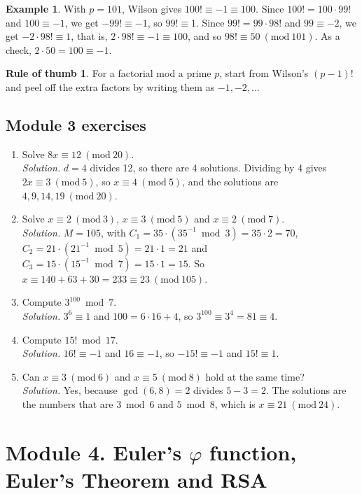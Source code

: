 \documentclass[11pt,a4paper]{article}
\theoremstyle{definition}
\newtheorem{example}[theorem]{Example}
\newcommand{\md}[1]{\ (\mathrm{mod}\ #1)}
\theoremstyle{noteit}
\theoremstyle{note}
\newtheorem*{thumbrule}{Rule of thumb}
\begin{document}
\begin{example}
With $p=101$, Wilson gives $100!\equiv-1\equiv100$. Since $100!=100\cdot99!$ and $100\equiv-1$, we get $-99!\equiv-1$, so $99!\equiv1$. Since $99!=99\cdot98!$ and $99\equiv-2$, we get $-2\cdot98!\equiv1$, that is, $2\cdot98!\equiv-1\equiv100$, and so $98!\equiv50\md{101}$. As a check, $2\cdot50=100\equiv-1$.
\end{example}

\begin{thumbrule}
For a factorial mod a prime $p$, start from Wilson's $(p-1)!$ and peel off the extra factors by writing them as $-1,-2,\dots$
\end{thumbrule}

\subsection*{Module 3 exercises}
\begin{enumerate}[label=\textbf{3.\arabic*}]
\item Solve $8x\equiv12\md{20}$.\\
\emph{Solution.} $d=4$ divides 12, so there are 4 solutions. Dividing by 4 gives $2x\equiv3\md5$, so $x\equiv4\md5$, and the solutions are $4,9,14,19\md{20}$.
\item Solve $x\equiv2\md3$, $x\equiv3\md5$ and $x\equiv2\md7$.\\
\emph{Solution.} $M=105$, with $C_1=35\cdot(35^{-1}\bmod3)=35\cdot2=70$, $C_2=21\cdot(21^{-1}\bmod5)=21\cdot1=21$ and $C_3=15\cdot(15^{-1}\bmod7)=15\cdot1=15$. So $x\equiv140+63+30=233\equiv23\md{105}$.
\item Compute $3^{100}\bmod7$.\\
\emph{Solution.} $3^6\equiv1$ and $100=6\cdot16+4$, so $3^{100}\equiv3^4=81\equiv4$.
\item Compute $15!\bmod17$.\\
\emph{Solution.} $16!\equiv-1$ and $16\equiv-1$, so $-15!\equiv-1$ and $15!\equiv1$.
\item Can $x\equiv3\md6$ and $x\equiv5\md{8}$ hold at the same time?\\
\emph{Solution.} Yes, because $\gcd(6,8)=2$ divides $5-3=2$. The solutions are the numbers that are $3\bmod6$ and $5\bmod 8$, which is $x\equiv21\md{24}$.
\end{enumerate}

\newpage
\section{Module 4. Euler's $\varphi$ function, Euler's Theorem and RSA}
\end{document}
